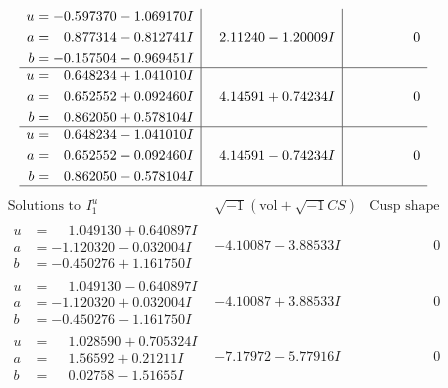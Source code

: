 \documentclass[1p]{elsarticle_modified}
\theoremstyle{definition}
\newcommand{\I}{\sqrt{-1}}
\begin{document}
$$\begin{array}{c|c|c}
\begin{aligned}
u &= -0.597370 - 1.069170 I \\
a &= \phantom{-}0.877314 - 0.812741 I \\
b &= -0.157504 - 0.969451 I\end{aligned}
 & \phantom{-}2.11240 - 1.20009 I & \phantom{-0.000000 } 0 \\ \hline\begin{aligned}
u &= \phantom{-}0.648234 + 1.041010 I \\
a &= \phantom{-}0.652552 + 0.092460 I \\
b &= \phantom{-}0.862050 + 0.578104 I\end{aligned}
 & \phantom{-}4.14591 + 0.74234 I & \phantom{-0.000000 } 0 \\ \hline\begin{aligned}
u &= \phantom{-}0.648234 - 1.041010 I \\
a &= \phantom{-}0.652552 - 0.092460 I \\
b &= \phantom{-}0.862050 - 0.578104 I\end{aligned}
 & \phantom{-}4.14591 - 0.74234 I & \phantom{-0.000000 } 0\\
 \hline 
 \end{array}$$\newpage$$\begin{array}{c|c|c}  
\text{Solutions to }I^u_{1}& \I (\text{vol} + \sqrt{-1}CS) & \text{Cusp shape}\\
 \hline 
\begin{aligned}
u &= \phantom{-}1.049130 + 0.640897 I \\
a &= -1.120320 - 0.032004 I \\
b &= -0.450276 + 1.161750 I\end{aligned}
 & -4.10087 - 3.88533 I & \phantom{-0.000000 } 0 \\ \hline\begin{aligned}
u &= \phantom{-}1.049130 - 0.640897 I \\
a &= -1.120320 + 0.032004 I \\
b &= -0.450276 - 1.161750 I\end{aligned}
 & -4.10087 + 3.88533 I & \phantom{-0.000000 } 0 \\ \hline\begin{aligned}
u &= \phantom{-}1.028590 + 0.705324 I \\
a &= \phantom{-}1.56592 + 0.21211 I \\
b &= \phantom{-}0.02758 - 1.51655 I\end{aligned}
 & -7.17972 - 5.77916 I & \phantom{-0.000000 } 0 \\ \hline\begin{aligned}

\end{aligned}
\end{array}$$
\end{document}
